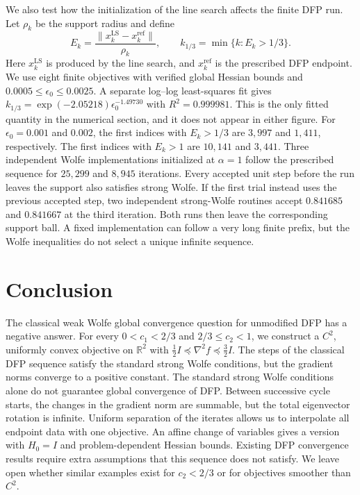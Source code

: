 \documentclass[11pt]{article}
\newcommand{\R}{\mathbb R}
\begin{document}
We also test how the initialization of the line search affects the finite
DFP run.  Let $\rho_k$ be the support radius and define
\[
E_k=\frac{\|x_k^{\mathrm{LS}}-x_k^{\mathrm{ref}}\|}{\rho_k},
\qquad
k_{1/3}=\min\{k:E_k>1/3\}.
\]
Here $x_k^{\mathrm{LS}}$ is produced by the line search, and
$x_k^{\mathrm{ref}}$ is the prescribed DFP endpoint.  We use eight finite
objectives with verified global Hessian bounds and
$0.0005\le\epsilon_0\le0.0025$.  A separate log--log least-squares fit gives
$k_{1/3}=\exp(-2.05218)\epsilon_0^{-1.49730}$ with $R^2=0.999981$.  This is the
only fitted quantity in the numerical section, and it does not appear in
either figure.  For $\epsilon_0=0.001$ and $0.002$, the first indices with
$E_k>1/3$ are $3{,}997$ and $1{,}411$, respectively.  The first indices with
$E_k>1$ are $10{,}141$ and $3{,}441$.  Three independent Wolfe implementations
initialized at $\alpha=1$ follow the prescribed sequence for $25{,}299$ and
$8{,}945$ iterations.  Every accepted unit step before the run leaves the
support also satisfies strong Wolfe.  If the first trial instead uses the
previous accepted step, two independent strong-Wolfe routines accept
$0.841685$ and $0.841667$ at the third iteration.  Both runs then leave the
corresponding support ball.  A fixed implementation can follow a very long
finite prefix, but the Wolfe inequalities do not select a unique infinite
sequence.

\FloatBarrier
\section{Conclusion}
\label{sec:conclusion}

The classical weak Wolfe global convergence question for unmodified DFP has a
negative answer.  For every $0<c_1<2/3$ and $2/3\le c_2<1$, we construct a
$C^2$, uniformly convex objective on $\R^2$ with
$\frac12I\preceq\nabla^2f\preceq\frac32I$.  The steps of the classical DFP
sequence satisfy the standard strong Wolfe conditions, but the gradient norms
converge to a positive constant.  The standard strong Wolfe conditions alone
do not guarantee global convergence of DFP.  Between successive
cycle starts, the changes in the gradient norm are summable, but the total
eigenvector rotation is infinite.  Uniform separation of the iterates allows
us to interpolate all endpoint data with one objective.  An affine change of
variables gives a version with $H_0=I$ and problem-dependent Hessian bounds.
Existing DFP convergence results require extra assumptions that this sequence
does not satisfy.  We leave open whether similar examples exist for $c_2<2/3$
or for objectives smoother than $C^2$.
\end{document}
